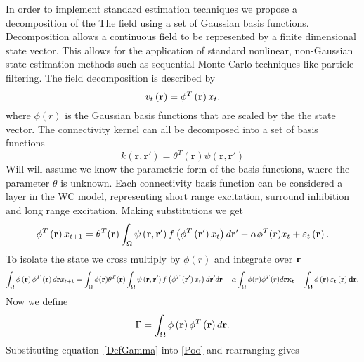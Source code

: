 \documentclass[onecolumn,draftcls]{IEEEtran}
\begin{document}
In order to implement standard estimation techniques we propose a decomposition of the The field using a set of Gaussian basis functions. Decomposition allows a continuous field to be represented by a finite dimensional state vector. This allows for the application of standard nonlinear, non-Gaussian state estimation methods such as sequential Monte-Carlo techniques like particle filtering. The field decomposition is described by
\begin{equation}\label{DefFieldDecomp}
{v_t}\left( {\bf{r}} \right) = {\phi ^T}\left( {\bf{r}} \right){x_t}.
\end{equation}
where $\phi(r)$ is the Gaussian basis functions that are scaled by the the state vector. The connectivity kernel can all be decomposed into a set of basis functions
\begin{equation}\label{DefKernelDecomp}
k( \mathbf{r} , \mathbf{r'} ) = \theta^T(\mathbf{r})\psi(\mathbf{r} , \mathbf{r'} )
\end{equation}
Will will assume we know the parametric form of the basis functions, where the parameter $\theta$ is unknown. Each connectivity basis function can be considered a layer in the WC model, representing short range excitation, surround inhibition and long range excitation. Making substitutions we get
\begin{equation}\label{DecompModel}
{\phi ^T}\left( \mathbf{r} \right){x_{t+1}} = \theta^T(\mathbf{r})\int_\Omega  {\psi \left( {{\bf{r}} , {\mathbf{r'}}} \right)f\left( {{\phi ^T}\left( {{\mathbf{r'}}} \right){x_t}} \right)d{\mathbf{r'}}}  - \alpha\phi^T(r)x_t + {\varepsilon _t}\left( {\mathbf{r}} \right).
\end{equation}
To isolate the state we cross multiply by $\phi(r)$ and integrate over $\bf{r}$
\begin{equation}\label{Poo}
\int_\Omega  {\phi \left( {\bf{r}} \right){\phi ^T}\left( {\bf{r}} \right)d{\bf{r}}{x_{t+1}}}  = \int_\Omega  {\phi ( \mathbf{r} )\theta^T(\mathbf{r})\int_\Omega  {\psi \left( {{\bf{r}} , {\bf{r'}}} \right)f\left( {{\phi ^T}\left( {{\bf{r'}}} \right){x_t}} \right)d{\bf{r'}}} d{\bf{r}}}  - \alpha\int_\Omega \phi(r)\phi^T(r)d\bf{r} x_t  + \int_\Omega  {\phi \left( {\bf{r}} \right){\varepsilon _t}\left( {\bf{r}} \right)d{\bf{r}}}.
\end{equation}
Now we define
\begin{equation}\label{DefGamma}
\Gamma  = \int_\Omega  {\phi \left( {\bf{r}} \right){\phi ^T}\left( {\bf{r}} \right)d{\bf{r}}}.
\end{equation}
Substituting equation~\ref{DefGamma} into \ref{Poo} and rearranging gives
\end{document}
